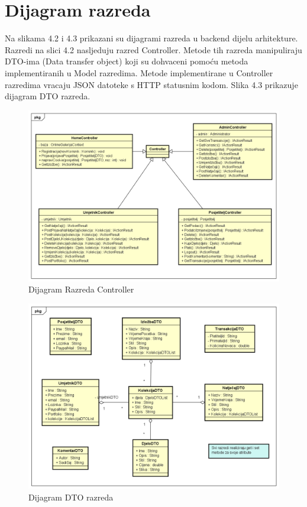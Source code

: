 			\eject
			
			
		\section{Dijagram razreda}
		
			{Na slikama 4.2 i 4.3 prikazani su dijagrami razreda u backend dijelu arhitekture.
			Razredi na slici 4.2 nasljeduju razred Controller. Metode tih razreda manipuliraju
			DTO-ima (Data transfer object) koji su dohvaceni pomoću metoda implementiranih
			u Model razredima. Metode implementirane u Controller razredima vracaju JSON
			datoteke s HTTP statusnim kodom. Slika 4.3 prikazuje dijagram DTO razreda. 	
			\vspace{10mm}
			
			\graphicspath{ {./slike/} }
			\begin{figure}[H]
				
				\includegraphics[width=\textwidth,height=\textheight,keepaspectratio]{Controller Class Diagram}
				\caption{\newline Dijagram Razreda Controller }
				
			\end{figure}
			
				\begin{figure}[H]
				
				\includegraphics[width=\textwidth,height=\textheight,keepaspectratio]{DTOdijagram}
				\caption{\newline Dijagram DTO razreda }
				

\end{figure}}
